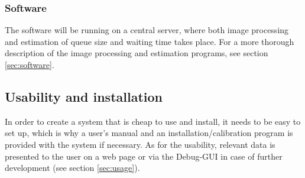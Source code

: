 \subsubsection{Software}
The software will be running on a central server, where both image processing and estimation of queue size and waiting time takes place. For a more thorough description of the image processing and estimation programs, see section \ref{sec:software}.

\subsection{Usability and installation}
In order to create a system that is cheap to use and install, it needs to be easy to set up, which is why a user's manual and an installation/calibration program is provided with the system if necessary. As for the usability, relevant data is presented to the user on a web page or via the Debug-GUI in case of further development (see section \ref{sec:usage}). 

